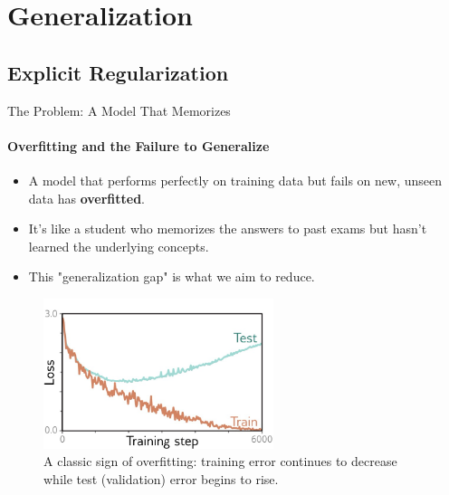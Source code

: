 \section{Generalization}

\subsection{Explicit Regularization}

\begin{frame}{The Problem: A Model That Memorizes}
    \framesubtitle{Overfitting and the Failure to Generalize}
    \begin{itemize}
        \item A model that performs perfectly on training data but fails on new, unseen data has \textbf{overfitted}.
        \item It's like a student who memorizes the answers to past exams but hasn't learned the underlying concepts.
        \item This "generalization gap" is what we aim to reduce.
    \end{itemize}
    \begin{figure}
        \includegraphics[width=0.6\textwidth]{images/generalization_gap.png}
        \caption{A classic sign of overfitting: training error continues to decrease while test (validation) error begins to rise.}
    \end{figure}
\end{frame}

